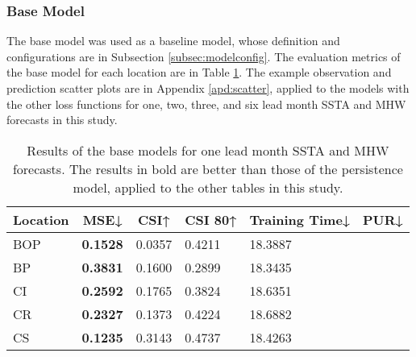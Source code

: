 \documentclass[11pt, a4paper]{article}
\begin{document}
\subsubsection{Base Model}

The base model was used as a baseline model, whose definition and configurations are in Subsection \ref{subsec:modelconfig}. The evaluation metrics of the base model for each location are in Table \ref{tb:vanilla}. The example observation and prediction scatter plots are in Appendix \ref{apd:scatter}, applied to the models with the other loss functions for one, two, three, and six lead month SSTA and MHW forecasts in this study.
\vspace{3mm}

\begin{table}[H]
\centering
\small
\caption{Results of the base models for one lead month SSTA and MHW forecasts. The results in bold are better than those of the persistence model, applied to the other tables in this study.}\label{tb:vanilla}
\begin{tabular}{llllll}
\multicolumn{1}{c}{\textbf{Location}} & \multicolumn{1}{c}{\textbf{MSE↓}} & \multicolumn{1}{c}{\textbf{CSI↑}} & \multicolumn{1}{c}{\textbf{CSI 80↑}} & \multicolumn{1}{c}{\textbf{Training Time↓}} & \multicolumn{1}{c}{\textbf{PUR↓}} \\ \hline
BOP                         & \textbf{0.1528}                   & 0.0357                            & 0.4211                               & 18.3887                                     &                                   \\
BP                        & \textbf{0.3831}                   & 0.1600                            & 0.2899                               & 18.3435                                     &                                   \\
CI                        & \textbf{0.2592}                   & 0.1765                            & 0.3824                               & 18.6351                                     &                                   \\
CR                           & \textbf{0.2327}                   & 0.1373                            & 0.4224                               & 18.6882                                     &                                   \\
CS                           & \textbf{0.1235}                   & 0.3143                            & 0.4737                               & 18.4263                                     &                                   \\

\end{tabular}
\end{table}
\end{document}
